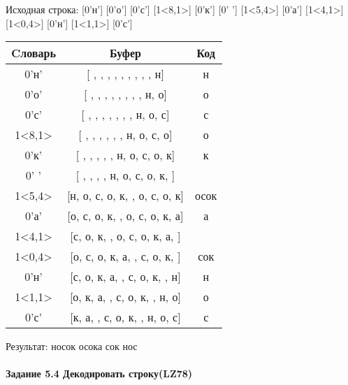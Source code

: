 \documentclass[a4paper, 12pt]{article}
\begin{document}
Исходная строка: [0'н'] [0'о'] [0'с'] [1<8,1>] [0'к'] [0' '] [1<5,4>] [0'а'] [1<4,1>] [1<0,4>] [0'н'] [1<1,1>] [0'с']\\
\begin{table}[h!]
\centering
\begin{tabular}{|c|c|c|}
\hline
 Cловарь & Буфер & Код  \\ \hline
0'н' & [ ,  ,  ,  ,  ,  ,  ,  ,  , н] & н
\\ \hline
0'о' & [ ,  ,  ,  ,  ,  ,  ,  , н, о] & о
\\ \hline
0'с' & [ ,  ,  ,  ,  ,  ,  , н, о, с] & с
\\ \hline
1<8,1> & [ ,  ,  ,  ,  ,  , н, о, с, о] & о
\\ \hline
0'к' & [ ,  ,  ,  ,  , н, о, с, о, к] & к
\\ \hline
0' ' & [ ,  ,  ,  , н, о, с, о, к,  ] &  
\\ \hline
1<5,4> & [н, о, с, о, к,  , о, с, о, к] & осок
\\ \hline
0'а' & [о, с, о, к,  , о, с, о, к, а] & а
\\ \hline
1<4,1> & [с, о, к,  , о, с, о, к, а,  ] &  
\\ \hline
1<0,4> & [о, с, о, к, а,  , с, о, к,  ] & сок 
\\ \hline
0'н' & [с, о, к, а,  , с, о, к,  , н] & н
\\ \hline
1<1,1> & [о, к, а,  , с, о, к,  , н, о] & о
\\ \hline
0'с' & [к, а,  , с, о, к,  , н, о, с] & с
\\ \hline
\end{tabular}
\end{table}

Результат: носок осока сок нос
\pagebreak
\paragraph{Задание 5.4 Декодировать строку(LZ78)\\}
\end{document}
